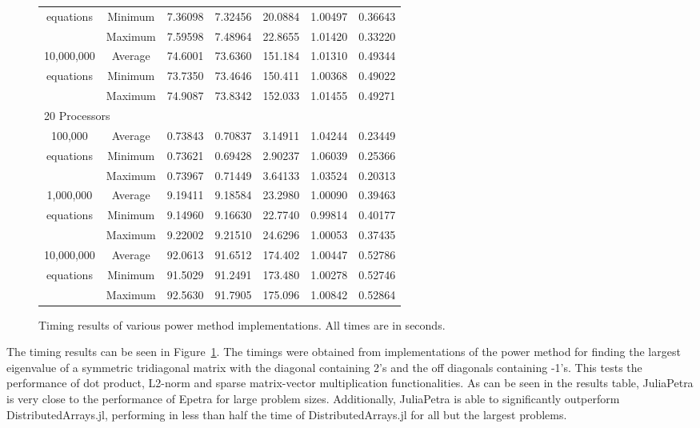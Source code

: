 \documentclass[acmsmall]{acmart}
\begin{document}
\begin{figure}
\begin{tabular}{|c c|r|r|r||r|r|}
		equations		&Minimum & 7.36098 & 7.32456 & 20.0884 & 1.00497 & 0.36643 \\
						&Maximum & 7.59598 & 7.48964 & 22.8655 & 1.01420 & 0.33220 \\
	\hline
		10,000,000		&Average & 74.6001 & 73.6360 & 151.184 & 1.01310 & 0.49344 \\
		equations		&Minimum & 73.7350 & 73.4646 & 150.411 & 1.00368 & 0.49022 \\
						&Maximum & 74.9087 & 73.8342 & 152.033 & 1.01455 & 0.49271 \\
	\hline
			\multicolumn{7}{|l|}{20 Processors}\\
	\hline
		100,000			&Average & 0.73843 & 0.70837 & 3.14911 & 1.04244 & 0.23449 \\
		equations		&Minimum & 0.73621 & 0.69428 & 2.90237 & 1.06039 & 0.25366 \\
						&Maximum & 0.73967 & 0.71449 & 3.64133 & 1.03524 & 0.20313 \\
	\hline
		1,000,000		&Average & 9.19411 & 9.18584 & 23.2980 & 1.00090 & 0.39463 \\
		equations		&Minimum & 9.14960 & 9.16630 & 22.7740 & 0.99814 & 0.40177 \\
						&Maximum & 9.22002 & 9.21510 & 24.6296 & 1.00053 & 0.37435 \\
	\hline
		10,000,000		&Average & 92.0613 & 91.6512 & 174.402 & 1.00447 & 0.52786 \\
		equations		&Minimum & 91.5029 & 91.2491 & 173.480 & 1.00278 & 0.52746 \\
						&Maximum & 92.5630 & 91.7905 & 175.096 & 1.00842 & 0.52864 \\
	\hline
\end{tabular}

\caption{Timing results of various power method implementations.  All times are in seconds.}
\label{fig:timing-results}
\end{figure}

The timing results can be seen in Figure~\ref{fig:timing-results}.
The timings were obtained from implementations of the power method for finding the largest eigenvalue
of a symmetric tridiagonal matrix with the diagonal containing 2's and the off diagonals containing -1's.
\cite{PowerMethod}
This tests the performance of dot product, L2-norm and sparse matrix-vector multiplication functionalities.
As can be seen in the results table, JuliaPetra is very close to the performance
of Epetra for large problem sizes.
Additionally, JuliaPetra is able to significantly outperform DistributedArrays.jl, performing in less than
half the time of DistributedArrays.jl for all but the largest problems.
\end{document}
